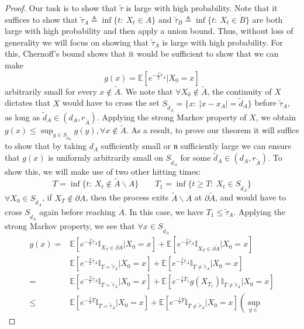 \documentclass[english, aip, jcp, priprint, graphicx,floatfix]{revtex4-1}
\theoremstyle{plain}
\theoremstyle{definition}
\theoremstyle{plain}
\newcommand{\dimension}{{\mathfrak{n}}}
\newcommand{\indicatorf}[1]{\mathbb{I}_{#1}}
\begin{document}
\begin{proof}
Our task is to show that $\tilde \tau$ is large with high probability.  Note that it suffices to show that $\tilde \tau_A \triangleq \inf\{t:\ X_t\in \dot A\}$ and $\tilde \tau_B \triangleq \inf\{t:\ X_t\in \dot B\}$ are both large with high probability and then apply a union bound.  Thus, without loss of generality we will focus on showing that $\tilde \tau_A$ is large with high probability.  For this, Chernoff's bound shows that it would be sufficient to show that we can make
\[
g(x)=\mathbb{E}[e^{-\frac{1}{2}\tilde \tau_A}|X_0=x]
\] 
arbitrarily small for every $x\notin \tilde A$. We note that $\forall X_0 \notin \tilde A$, the continuity of $X$ dictates that $X$ would have to cross the set $S_{\tilde d_A}=\{x:\ |x-x_A| = \tilde d_A\}$ before $\tilde \tau_A$, as long as $\tilde d_A \in (d_A,r_{\tilde A})$.  Applying the strong Markov property of $X$, we obtain $g(x)\leq \sup_{y\in S_{\tilde d_A}}g(y), \forall x \notin \tilde A$. As a result, to prove our theorem it will suffice to show that by taking $d_A$ sufficiently small or $\dimension$ sufficiently large we can ensure that $g(x)$ is uniformly arbitrarily small on $S_{\tilde d_A}$ for some $\tilde d_A \in (d_A,r_{\tilde A})$.  To show this, we will make use of two other hitting times:
\[
T =\inf \{t:\ X_t \notin \tilde A \backslash \dot A\} 
\qquad
T_1 =\inf \{t\geq T:\ X_t \in S_{\tilde d_A}\} 
\]
$\forall X_0 \in S_{\tilde d_A}$, if $X_T\notin \partial\dot A$, then the process exits $\tilde A \backslash \dot A$ at $\partial \tilde A$, and would have to cross $S_{\tilde d_A}$ again before reaching $\dot A$. In this case, we have $T_1 \leq \tilde \tau_A$.  Applying the strong Markov property, we see that $\forall x\in S_{\tilde d_A}$
\begin{align*}
	g(x) = &\mathbb{E}[e^{-\frac{1}{2}\tilde \tau_A}\indicatorf{X_T \in\partial\dot A}|X_0=x]+ \mathbb{E}[e^{-\frac{1}{2}\tilde \tau_A}\indicatorf{X_T \in\partial\tilde A}|X_0=x]\\
	       &\mathbb{E}[e^{-\frac{1}{2}\tilde \tau_A}\indicatorf{T=\tilde \tau_A}|X_0=x]+ \mathbb{E}[e^{-\frac{1}{2}\tilde \tau_A}\indicatorf{T\neq\tilde \tau_A}|X_0=x]\\
     = & \mathbb{E}[e^{-\frac{1}{2}\tilde \tau_A}\indicatorf{T=\tilde \tau_A}|X_0=x]+
     \mathbb{E}[e^{-\frac{1}{2}T_1}g(X_{T_1})\indicatorf{T\neq\tilde \tau_A}|X_0=x]\\
     \leq & \mathbb{E}[e^{-\frac{1}{2}T}\indicatorf{T=\tilde \tau_A}|X_0=x]+
                    \mathbb{E}[e^{-\frac{1}{2}T}\indicatorf{T\neq\tilde \tau_A}|X_0=x]\left(\sup_{y\in 
}
\end{align*}
\end{proof}
\end{document}
